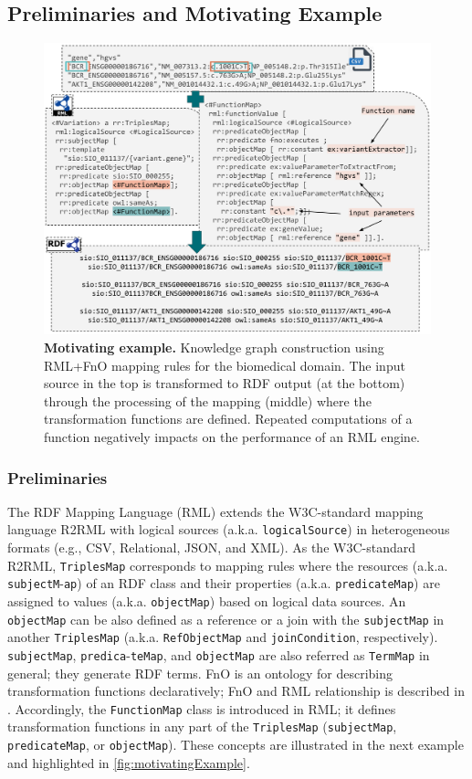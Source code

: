 \subsection{Preliminaries and Motivating Example}
\label{sec:example}
\begin{figure}[t!]
\centering
\includegraphics[width=\textwidth]{figures/motivating_example.png}
\caption{\textbf{Motivating example.} Knowledge graph construction using RML+FnO mapping rules for the biomedical domain. The input source in the top is transformed to RDF output (at the bottom) through the processing of the mapping (middle) where the transformation functions are defined. Repeated computations of a function negatively impacts on the performance of an RML engine.} 
\label{fig:motivatingExample}
\end{figure}

\subsubsection{Preliminaries}
\label{sec:preliminaries}
The RDF Mapping Language (RML) extends the W3C-standard mapping language R2RML with logical sources (a.k.a. \verb|logicalSource|) in heterogeneous formats (e.g., CSV, Relational, JSON, and XML). As the W3C-standard R2RML, \verb|TriplesMap| corresponds to mapping rules where the resources (a.k.a. \verb|subjectM|-\verb|ap|) of an RDF class and their properties (a.k.a. \verb|predicateMap|) are assigned to values (a.k.a. \verb|objectMap|) based on logical data sources. An \verb|objectMap| can be also defined as a reference or a join with the \verb|subjectMap| in another \verb|TriplesMap| (a.k.a. \verb|RefObjectMap| and \verb|joinCondition|, respectively). \verb|subjectMap|, \verb|predica|-\verb|teMap|, and \verb|objectMap| are also referred as \verb|TermMap| in general; they generate RDF terms. FnO is an ontology for describing transformation functions declaratively; FnO and RML relationship is described in \cite{de2017declarative}. Accordingly, the \verb|FunctionMap| class is introduced in RML; it defines transformation functions in any part of the \verb|TriplesMap| (\verb|subjectMap|, \verb|predicateMap|, or \verb|objectMap|). These concepts are illustrated in the next example and highlighted in \autoref{fig:motivatingExample}.

